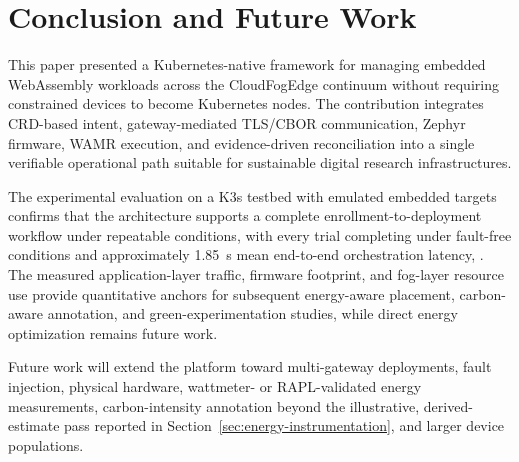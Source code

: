 \section{Conclusion and Future Work}\label{sec:conclusion}

This paper presented a Kubernetes-native framework for managing embedded WebAssembly workloads across the Cloud\textendash{}Fog\textendash{}Edge continuum without requiring constrained devices to become Kubernetes nodes. The contribution integrates CRD-based intent, gateway-mediated TLS/CBOR communication, Zephyr firmware, WAMR execution, and evidence-driven reconciliation into a single verifiable operational path suitable for sustainable digital research infrastructures.

{\color{red}The experimental evaluation on a K3s testbed with emulated embedded targets confirms that the architecture supports a complete enrollment-to-deployment workflow under repeatable conditions, %
with every trial completing under fault-free conditions and approximately 1.85~s mean end-to-end orchestration latency, . The measured application-layer traffic, firmware footprint, and fog-layer resource use provide quantitative anchors for subsequent energy-aware placement, carbon-aware annotation, and green-experimentation studies, while direct energy optimization remains future work.}

Future work will extend the platform toward multi-gateway deployments, fault injection, physical hardware, wattmeter- or RAPL-validated energy measurements{\color{blue}, carbon-intensity annotation beyond the illustrative, derived-estimate pass reported in Section~\ref{sec:energy-instrumentation}}, and larger device populations.
